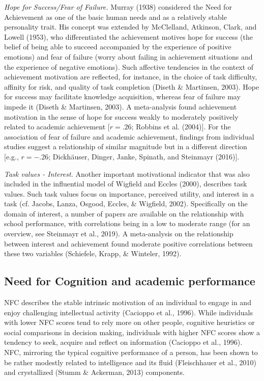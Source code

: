 \documentclass[
  man]{apa6}
\begin{document}
\emph{Hope for Success/Fear of Failure.} Murray (1938) considered the Need for Achievement as one of the basic human needs and as a relatively stable personality trait. His concept was extended by McClelland, Atkinson, Clark, and Lowell (1953), who differentiated the achievement motives hope for success (the belief of being able to succeed accompanied by the experience of positive emotions) and fear of failure (worry about failing in achievement situations and the experience of negative emotions). Such affective tendencies in the context of achievement motivation are reflected, for instance, in the choice of task difficulty, affinity for risk, and quality of task completion (Diseth \& Martinsen, 2003). Hope for success may facilitate knowledge acquisition, whereas fear of failure may impede it (Diseth \& Martinsen, 2003). A meta-analysis found achievement motivation in the sense of hope for success weakly to moderately positively related to academic achievement {[}\(r=.26\); Robbins et al. (2004){]}. For the association of fear of failure and academic achievement, findings from individual studies suggest a relationship of similar magnitude but in a different direction {[}e.g., \(r=-.26\); Dickhäuser, Dinger, Janke, Spinath, and Steinmayr (2016){]}.

\emph{Task values - Interest.} Another important motivational indicator that was also included in the influential model of Wigfield and Eccles (2000), describes task values. Such task values focus on importance, perceived utility, and interest in a task (cf. Jacobs, Lanza, Osgood, Eccles, \& Wigfield, 2002). Specifically on the domain of interest, a number of papers are available on the relationship with school performance, with correlations being in a low to moderate range (for an overview, see Steinmayr et al., 2019). A meta-analysis on the relationship between interest and achievement found moderate positive correlations between these two variables (Schiefele, Krapp, \& Winteler, 1992).

\hypertarget{need-for-cognition-and-academic-performance}{%
\subsection{Need for Cognition and academic performance}\label{need-for-cognition-and-academic-performance}}

NFC describes the stable intrinsic motivation of an individual to engage in and enjoy challenging intellectual activity (Cacioppo et al., 1996). While individuals with lower NFC scores tend to rely more on other people, cognitive heuristics or social comparisons in decision making, individuals with higher NFC scores show a tendency to seek, acquire and reflect on information (Cacioppo et al., 1996). NFC, mirroring the typical cognitive performance of a person, has been shown to be rather modestly related to intelligence and its fluid (Fleischhauer et al., 2010) and crystallized (Stumm \& Ackerman, 2013) components.
\end{document}
